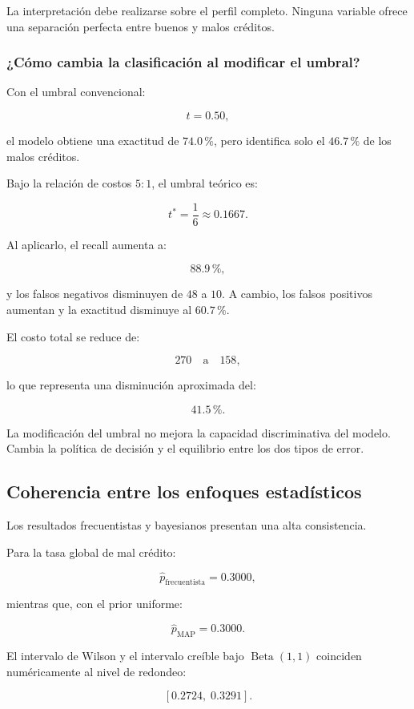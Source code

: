 La interpretación debe realizarse sobre el perfil completo. Ninguna
variable ofrece una separación perfecta entre buenos y malos créditos.

\subsubsection{¿Cómo cambia la clasificación al modificar el umbral?}

Con el umbral convencional:

\[
t=0.50,
\]

el modelo obtiene una exactitud de \(74.0\,\%\), pero identifica solo el
\(46.7\,\%\) de los malos créditos.

Bajo la relación de costos \(5:1\), el umbral teórico es:

\[
t^{*}
=
\frac{1}{6}
\approx
0.1667.
\]

Al aplicarlo, el recall aumenta a:

\[
88.9\,\%,
\]

y los falsos negativos disminuyen de \(48\) a \(10\). A cambio, los
falsos positivos aumentan y la exactitud disminuye al \(60.7\,\%\).

El costo total se reduce de:

\[
270
\quad\text{a}\quad
158,
\]

lo que representa una disminución aproximada del:

\[
41.5\,\%.
\]

La modificación del umbral no mejora la capacidad discriminativa del
modelo. Cambia la política de decisión y el equilibrio entre los dos
tipos de error.

\subsection{Coherencia entre los enfoques estadísticos}

Los resultados frecuentistas y bayesianos presentan una alta
consistencia.

Para la tasa global de mal crédito:

\[
\widehat{p}_{\mathrm{frecuentista}}
=
0.3000,
\]

mientras que, con el prior uniforme:

\[
\widehat{p}_{\mathrm{MAP}}
=
0.3000.
\]

El intervalo de Wilson y el intervalo creíble bajo
\(\operatorname{Beta}(1,1)\) coinciden numéricamente al nivel de redondeo:

\[
[0.2724,\;0.3291].
\]


